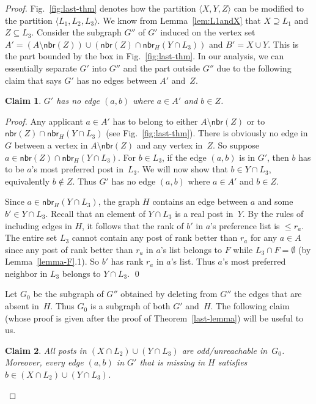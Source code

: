 \documentclass[11pt]{llncs}
\newtheorem{new-claim}{Claim}
\newcommand{\Nbr}{\mathsf{nbr}}
\begin{document}
\begin{proof}
Fig.~\ref{fig:last-thm} denotes how the partition $\langle X,Y,Z\rangle$ can be
modified to the partition $\langle L_1,L_2,L_3\rangle$. We know from  Lemma~\ref{lem:L1andX} 
that $X \supseteq L_1$ and $Z \subseteq L_3$.
Consider the subgraph $G''$ of $G'$ induced on the vertex set 
$A' = (A \setminus \Nbr(Z)) \cup (\Nbr(Z)\cap\Nbr_H(Y \cap L_3))$ and $B' = X \cup Y$. 
This is the part bounded by the box in Fig.~\ref{fig:last-thm}. 
In our analysis, we can essentially separate $G'$ into $G''$ and the part outside $G''$ 
due to the following claim that says $G'$ has no edges between $A'$ and~$Z$.

\begin{new-claim}
\label{claim1}
$G'$ has no edge $(a,b)$ where $a \in A'$ and $b \in Z$. 
\end{new-claim}
\begin{proof}
Any applicant $a \in A'$ has to belong to either $A \setminus \Nbr(Z)$ or to 
$\Nbr(Z)\cap\Nbr_H(Y\cap L_3)$ (see Fig.~\ref{fig:last-thm}). 
There is obviously no edge in $G$ between a vertex in $A \setminus \Nbr(Z)$ and any vertex in~$Z$. So suppose $a \in \Nbr(Z)\cap\Nbr_H(Y \cap L_3)$. For $b \in L_3$, if the edge $(a,b)$
is in $G'$, then $b$ has to be $a$'s most preferred post in~$L_3$. We will now show that 
$b \in Y \cap L_3$, equivalently $b \notin Z$. 
Thus $G'$ has no edge $(a,b)$ where $a \in A'$ and $b \in Z$.

Since $a\in \Nbr_H(Y \cap L_3)$, the graph $H$ contains an edge between $a$ and some 
$b' \in  Y \cap L_3$. Recall that an element of $Y \cap L_3$ is a real post in~$Y$. 
By the rules of including edges in $H$, it follows that the rank of $b'$ in $a$'s preference 
list is $\le r_a$. The entire set $L_3$ cannot contain any post of rank better than $r_a$ for any 
$a \in A$ since any post of rank better than $r_a$ in $a$'s list belongs to $F$ while 
$L_3 \cap F = \emptyset$ (by Lemma~\ref{lemma-F}.1). So $b'$ has rank $r_a$ in $a$'s list.
Thus $a$'s most preferred neighbor in $L_3$ belongs to $Y \cap L_3$. \qed
\end{proof}




Let $G_0$ be the subgraph of $G''$ obtained by deleting from $G''$ the edges that are absent 
in~$H$. Thus $G_0$ is a subgraph of both $G'$ and~$H$. The following claim (whose proof is given 
after the proof of Theorem~\ref{last-lemma}) will be useful to us.

\begin{new-claim}
\label{claim2}
All posts in $(X \cap L_2) \cup (Y \cap L_3)$ are odd/unreachable in~$G_0$.
Moreover, every edge $(a,b)$ in $G'$ that is missing in $H$ satisfies 
$b \in (X \cap L_2) \cup (Y \cap L_3)$.
\end{new-claim}


\end{proof}
\end{document}
